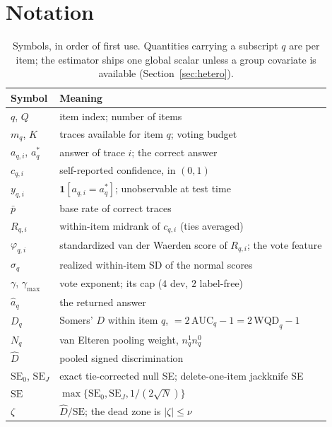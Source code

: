 \documentclass[conference]{IEEEtran}
\newcommand{\Dhat}{\widehat{D}}
\begin{document}
\section{Notation}\label{app:notation}
\begingroup
\setlength{\tabcolsep}{4pt}
\renewcommand{\arraystretch}{1.12}
\begin{table}[H]
\centering
\caption{Symbols, in order of first use. Quantities carrying a subscript $q$
are per item; the estimator ships one global scalar unless a group covariate is
available (Section~\ref{sec:hetero}).}
\label{tab:notation}
\footnotesize
\begin{tabular}{@{}l p{5.55cm}@{}}
\toprule
Symbol & Meaning \\
\midrule
$q$, $Q$ & item index; number of items \\
$m_q$, $K$ & traces available for item $q$; voting budget \\
$a_{q,i}$, $a^\ast_q$ & answer of trace $i$; the correct answer \\
$c_{q,i}$ & self-reported confidence, in $(0,1)$ \\
$y_{q,i}$ & $\mathbf{1}[a_{q,i}=a^\ast_q]$; unobservable at test time \\
$\bar p$ & base rate of correct traces \\
\midrule
$R_{q,i}$ & within-item midrank of $c_{q,i}$ (ties averaged) \\
$\varphi_{q,i}$ & standardized van der Waerden score of $R_{q,i}$; the vote feature \\
$\sigma_q$ & realized within-item SD of the normal scores \\
$\gamma$, $\gamma_{\max}$ & vote exponent; its cap ($4$ dev, $2$ label-free) \\
$\hat a_q$ & the returned answer \\
\midrule
$D_q$ & Somers' $D$ within item $q$, $=2\,\mathrm{AUC}_q-1=2\,\mathrm{WQD}_q-1$ \\
$N_q$ & van Elteren pooling weight, $n^1_qn^0_q$ \\
$\Dhat$ & pooled signed discrimination \\
$\mathrm{SE}_0$, $\mathrm{SE}_J$ & exact tie-corrected null SE; delete-one-item jackknife SE \\
$\mathrm{SE}$ & $\max\{\mathrm{SE}_0,\mathrm{SE}_J,1/(2\sqrt N)\}$ \\
$\zeta$ & $\Dhat/\mathrm{SE}$; the dead zone is $|\zeta|\le\nu$ \\

\end{tabular}
\end{table}
\end{document}
